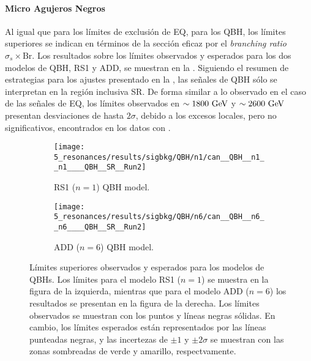 \paragraph{Micro Agujeros Negros}
\label{paragraph:results:results:bkgsig:results:qbh}

Al igual que para los límites de exclusión de \ac{EQ}, para los \ac{QBH}, los límites superiores se indican en términos de la sección eficaz por el \textit{branching ratio} \(\sigma_s \times \text{Br}\).
Los resultados sobre los límites observados y esperados para los dos modelos de \ac{QBH}, RS1 y ADD, se muestran en la \Fig{\ref{fig:results:results:bkgsig:results:qbh:limits}}. Siguiendo el resumen de estrategias para los ajustes presentado en la \Tab{\ref{tab:bkg:modeling:strategy_modeling:summary}}, las señales de \ac{QBH} sólo se interpretan en la región inclusiva SR. De forma similar a lo observado en el caso de las señales de \ac{EQ}, los límites observados en \(\sim 1800~\text{GeV}\) y \(\sim 2600~\text{GeV}\) presentan desviaciones de hasta \(2\sigma\), debido a los excesos locales, pero no significativos, encontrados en los datos con \bh.

\begin{figure}[ht!]
    \centering
    \begin{subfigure}[h]{0.49\linewidth}
        \centering
        \texttt{[image: 5\_resonances/results/sigbkg/QBH/n1/can\_\_QBH\_\_n1\_\_n1\_\_\_\_QBH\_\_SR\_\_Run2]}
        \caption{RS1 (\(n=1\)) \ac{QBH} model.}
    \end{subfigure}
    \hfill
    \begin{subfigure}[h]{0.49\linewidth}
        \centering
        \texttt{[image: 5\_resonances/results/sigbkg/QBH/n6/can\_\_QBH\_\_n6\_\_n6\_\_\_\_QBH\_\_SR\_\_Run2]}
        \caption{ADD (\(n=6\)) \ac{QBH} model.}
    \end{subfigure}
    \caption{Límites superiores observados y esperados para los modelos de \acp{QBH}. Los límites para el modelo RS1 (\(n=1\)) se muestra en la figura de la izquierda, mientras que para el modelo ADD (\(n=6\)) los resultados se presentan en la figura de la derecha. Los límites observados se muestran con los puntos y líneas negras sólidas. En cambio, los límites esperados están representados por las líneas punteadas negras, y las incertezas de \(\pm 1\) y \(\pm 2 \sigma\) se muestran con las zonas sombreadas de verde y amarillo, respectvamente.}
    \label{fig:results:results:bkgsig:results:qbh:limits}
\end{figure}

